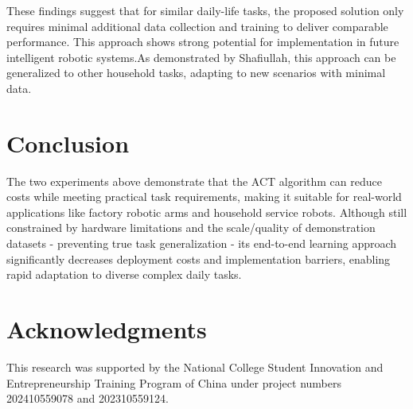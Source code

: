 \documentclass[runningheads]{llncs}
\begin{document}
These findings suggest that for similar daily-life tasks, the proposed solution only requires minimal additional data collection and training to deliver comparable performance. This approach shows strong potential for implementation in future intelligent robotic systems.As demonstrated by Shafiullah\cite{ref17}, this approach can be generalized to other household tasks, adapting to new scenarios with minimal data.


\section{Conclusion}
The two experiments above demonstrate that the ACT algorithm can reduce costs while meeting practical task requirements, making it suitable for real-world applications like factory robotic arms and household service robots. Although still constrained by hardware limitations and the scale/quality of demonstration datasets - preventing true task generalization - its end-to-end learning approach significantly decreases deployment costs and implementation barriers, enabling rapid adaptation to diverse complex daily tasks.

\section{Acknowledgments}
This research was supported by the National College Student Innovation and Entrepreneurship Training Program of China under project numbers 202410559078 and 202310559124.




\end{document}
